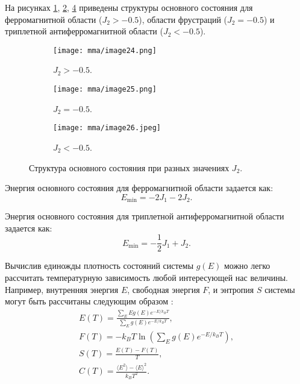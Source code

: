 На рисунках \ref{mma-fig-4}, \ref{mma-fig-5}, \ref{mma-fig-6} приведены структуры основного состояния для ферромагнитной области ($J_2 > -0.5$), области фрустраций ($J_2 = -0.5$) и триплетной антиферромагнитной области ($J_2 < -0.5$).
\begin{figure}[h]
    \begin{center}
        \begin{subfigure}{0.3\textwidth}
            \begin{center}
                \texttt{[image: mma/image24.png]}
            \end{center}
            \caption{$J_2 > -0.5$.}
            \label{mma-fig-4}
        \end{subfigure}
        \begin{subfigure}{0.3\textwidth}
            \begin{center}
                \texttt{[image: mma/image25.png]}
            \end{center}
            \caption{$J_2 = -0.5$.}
            \label{mma-fig-5}
        \end{subfigure}
        \begin{subfigure}{0.3\textwidth}
            \begin{center}
                \texttt{[image: mma/image26.jpeg]}
            \end{center}
            \caption{$J_2 < -0.5$.}
            \label{mma-fig-6}
        \end{subfigure}
    \end{center}
    \caption{Структура основного состояния при разных значениях $J_2$.}
\end{figure}

Энергия основного состояния для ферромагнитной области задается как:
\begin{equation}
    \label{mma-eq-2}
    E_{\min} = -2J_1 - 2J_2.
\end{equation}

Энергия основного состояния для триплетной антиферромагнитной области задается как:
\begin{equation}
    \label{mma-eq-3}
    E_{\min} = - \frac{1}{2} J_1 + J_2.
\end{equation}

Вычислив единожды плотность состояний системы $g(E)$ можно легко рассчитать температурную зависимость любой интересующей нас величины. Например, внутренняя энергия $E$, свободная энергия $F$, и энтропия $S$ системы могут быть рассчитаны следующим образом \cite{mma-bib-14}:
\begin{gather}
    \label{mma-eq-4}
    E(T) = \frac{\sum_{E} Eg(E) e^{-E/k_B T}}{\sum_{E} g(E) e^{-E/k_B T}},
    \\
    \label{mma-eq-5}
    F(T) = -k_B T \ln \left( \sum_E g(E) e^{-E/k_B T} \right),
    \\
    \label{mma-eq-6}
    S(T) = \frac{E(T) - F(T)}{T},
    \\
    \label{mma-eq-7}
    C(T) = \frac{\langle E^2 \rangle - \langle E \rangle^2}{k_B T^2}.
\end{gather}

